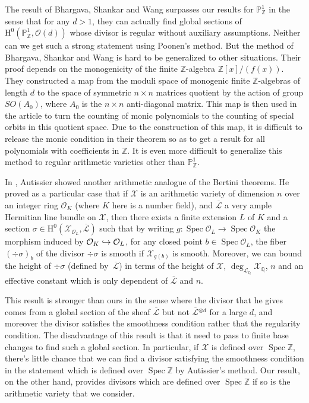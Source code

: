 \documentclass[11pt]{article}
\numberwithin{equation}{section}
\newcommand\hto{\mathrel{\lhook\joinrel\to}}
\theoremstyle{plain}
\theoremstyle{definition}
\newcommand{\ho}{\mathrm{H}}
\newcommand{\X}{\mathcal{X}}
\newcommand{\Li}{\overline{\mathcal{L}}{}}
\newcommand{\li}{\mathcal{L}}
\newcommand{\Q}{\mathbb{Q}}
\newcommand{\Z}{\mathbb{Z}}
\newcommand{\pr}{\mathbb{P}}
\DeclareMathOperator{\Spec}{Spec}
\begin{document}
The result of Bhargava, Shankar and Wang surpasses our results for $\pr^1_{\Z}$ in the sense that for any $d>1$, they can actually find global sections of $\ho^0(\pr^1_{\Z}, \mathcal{O}(d))$ whose divisor is regular without auxiliary assumptions. Neither can we get such a strong statement using Poonen's method. But the method of Bhargava, Shankar and Wang is hard to be generalized to other situations. Their proof depends on the monogenicity of the finite $\Z$-algebra $\Z[x]/(f(x))$. They constructed a map from the moduli space of monogenic finite $\Z$-algebras of length $d$ to the space of symmetric $n\times n$ matrices quotient by the action of group $SO(A_0)$, where $A_0$ is the $n\times n$ anti-diagonal matrix. This map is then used in the article to turn the counting of monic polynomials to the counting of special orbits in this quotient space. Due to the construction of this map, it is difficult to release the monic condition in their theorem so as to get a result for all polynomials with coefficients in $\Z$. It is even more difficult to generalize this method to regular arithmetic varieties other than $\pr^1_{\Z}$.\enlargethispage{\baselineskip}

In \cite{Au01}, Autissier showed another arithmetic analogue of the Bertini theorems. He proved as a particular case that if $\X$ is an arithmetic variety of dimension $n$ over an integer ring $\mathcal{O}_K$ (where $K$ here is a number field), and $\Li$ a very ample Hermitian line bundle on $\X$, then there exists a finite extension $L$ of $K$ and a section $\sigma\in \ho^0(\X_{\mathcal{O}_L}, \Li)$ such that by writing $g:\Spec \mathcal{O}_L\to \Spec \mathcal{O}_K$ the morphism induced by $\mathcal{O}_K\hto \mathcal{O}_L$, for any closed point $b\in \Spec \mathcal{O}_L$, the fiber $(\div \sigma)_b$ of the divisor $\div \sigma$ is smooth if $\X_{g(b)}$ is smooth. Moreover, we can bound the height of $\div \sigma$ (defined by~$\Li$) in terms of the height of $\X$, $\deg_{\li_{\Q}}\X_{\Q}$, $n$ and an effective constant which is only dependent of $\Li$ and $n$.

This result is stronger than ours in the sense where the divisor that he gives comes from a global section of the sheaf $\Li$ but not $\Li^{\otimes d}$ for a large $d$, and moreover the divisor satisfies the smoothness condition rather that the regularity condition. The disadvantage of this result is that it need to pass to finite base changes to find such a global section. In particular, if $\X$ is defined over $\Spec \Z$, there's little chance that we can find a divisor satisfying the smoothness condition in the statement which is defined over $\Spec \Z$ by Autissier's method. Our result, on the other hand, provides divisors which are defined over $\Spec \Z$ if so is the arithmetic variety that we consider.
\end{document}
